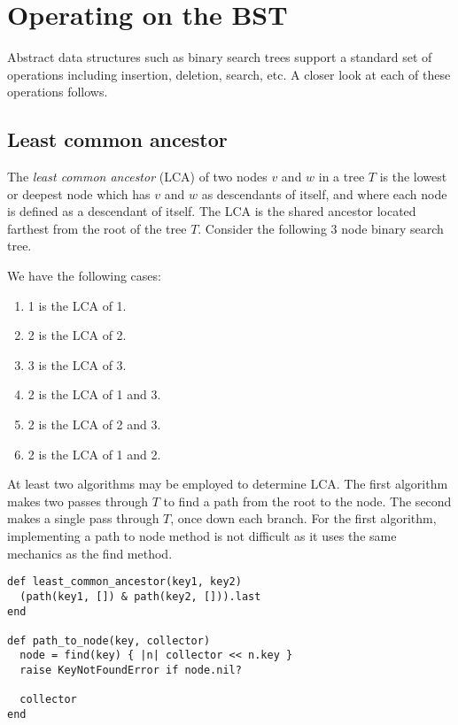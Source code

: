 \documentclass{article}
\begin{document}



\section{Operating on the BST}

Abstract data structures such as binary search trees support a standard
set of operations including insertion, deletion, search, etc. A closer look
at each of these operations follows.

\subsection{Least common ancestor}

The \textit{least common ancestor} (LCA) of two nodes $v$ and $w$ in a tree $T$ is the
lowest or deepest node which has $v$ and $w$ as descendants of itself, and where
each node is defined as a descendant of itself. The LCA is the shared ancestor located
farthest from the root of the tree $T$. Consider the following 3 node binary search tree.


We have the following cases:

\begin{enumerate}
  \item 1 is the LCA of 1.
  \item 2 is the LCA of 2.
  \item 3 is the LCA of 3.
  \item 2 is the LCA of 1 and 3.
  \item 2 is the LCA of 2 and 3.
  \item 2 is the LCA of 1 and 2.
\end{enumerate}

At least two algorithms may be employed to determine LCA. The first algorithm makes
two passes through $T$ to find a path from the root to the node. The second makes a
single pass through $T$, once down each branch. For the first algorithm, implementing
a path to node method is not difficult as it uses the same mechanics as the find method.

\begin{lstlisting}[frame=single,title=Two pass algorithm for LCA.]
def least_common_ancestor(key1, key2)
  (path(key1, []) & path(key2, [])).last
end

def path_to_node(key, collector)
  node = find(key) { |n| collector << n.key }
  raise KeyNotFoundError if node.nil?

  collector
end
\end{lstlisting}
\end{document}
